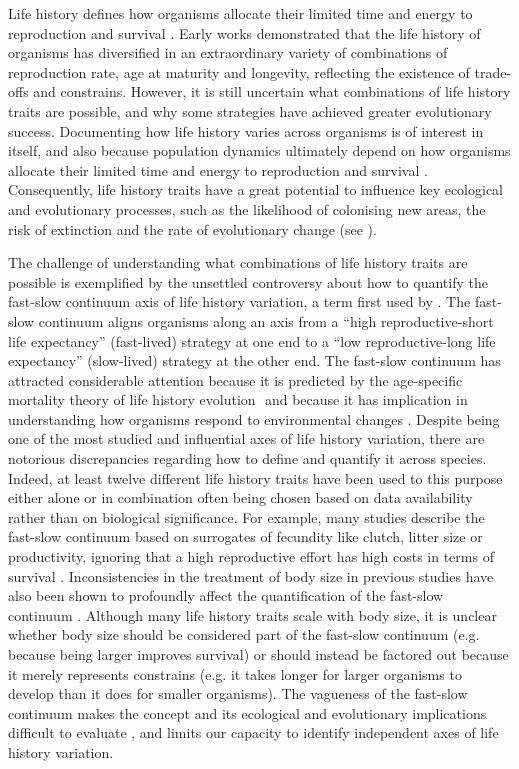 Life history defines how organisms allocate their limited time and energy to
reproduction and survival \citep{stearns1992evolution}. Early works demonstrated
that the life history of organisms has diversified in an extraordinary variety
of combinations of reproduction rate, age at maturity and longevity, reflecting
the existence of trade-offs and constrains. However, it is  still uncertain
what combinations of life history traits are possible, and why some strategies
have achieved greater evolutionary success. Documenting how life history
varies across organisms is of interest in itself, and also because population
dynamics ultimately depend on how organisms allocate their limited time and
energy to reproduction and survival \citep{stearns1992evolution}. Consequently,
life history traits have a great potential to influence key ecological and
evolutionary processes, such as the likelihood of colonising new areas, the risk
of extinction and the rate of evolutionary change (see
\citet{stearns1992evolution,roff1992evolution,roff2002}).

The challenge of understanding what combinations of life history traits are
possible is exemplified by the unsettled controversy about how to quantify the
fast-slow continuum axis of life history variation, a term first used by
\citet{Stearns1983a}. The fast-slow continuum aligns organisms along an axis
from a “high reproductive-short life expectancy” (fast-lived) strategy at one
end to a “low reproductive-long life expectancy” (slow-lived) strategy at the
other end.
The fast-slow continuum has attracted considerable attention because it is
predicted by the age-specific mortality theory of life history evolution
\citep{Stearns1977,Charlesworth1980}⁠ and because it has implication in
understanding how organisms respond to environmental changes
\citep{Saether2000,Forcada2008,Sol2012a}.
Despite being one of the most studied and influential axes of life history
variation, there are notorious discrepancies regarding how to define and
quantify it across species. Indeed, at least twelve different life history
traits have been used to this purpose either alone or in combination often
being chosen based on data availability rather than on biological significance.
For example, many studies describe the fast-slow continuum based on surrogates
of fecundity like clutch, litter size or productivity, ignoring that a high
reproductive effort has high costs in terms of survival \citep{Adler2014}.
Inconsistencies in the treatment of body size in previous studies have also
been shown to profoundly affect the quantification of the fast-slow continuum
\citep{Jeschke2009}.
Although many life history traits scale with body size, it is unclear whether
body size should be considered part of the fast-slow continuum (e.g. because
being larger improves survival) or should instead be factored out because it
merely represents constrains (e.g. it takes longer for larger organisms to
develop than it does for smaller organisms). The vagueness of the fast-slow
continuum makes the concept and its ecological and evolutionary implications
difficult to evaluate \citep{Jeschke2009}, and limits our capacity to identify
independent axes of life history variation.

